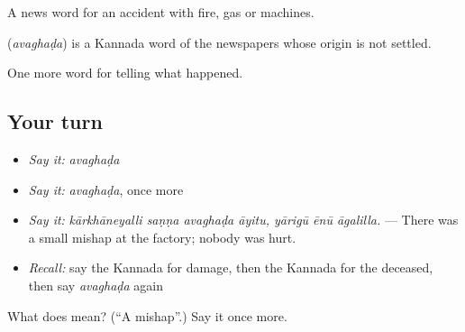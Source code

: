 A news word for an accident with fire, gas or machines.

\begin{cousinweb}
\textbf{} (\emph{avaghaḍa}) is a Kannada word of the newspapers whose origin is not settled.
\end{cousinweb}

\begin{grammarlens}[title={What you've built}]
One more word for telling what happened.
\end{grammarlens}

\subsection*{Your turn}
\begin{itemize}
\raggedright
  \item \emph{Say it:} \emph{avaghaḍa}
  \item \emph{Say it:} \emph{avaghaḍa}, once more
  \item \emph{Say it:} \emph{kārkhāneyalli saṇṇa avaghaḍa āyitu, yārigū ēnū āgalilla.} — There was a small mishap at the factory; nobody was hurt.
  \item \emph{Recall:} say the Kannada for damage, then the Kannada for the deceased, then say \emph{avaghaḍa} again
\end{itemize}

\begin{tcolorbox}[breakable,colback=teal!4,colframe=teal!35!black,title={Before you move on}]
What does  mean? (\textquotedblleft{}A mishap\textquotedblright{}.) Say it once more.
\end{tcolorbox}
